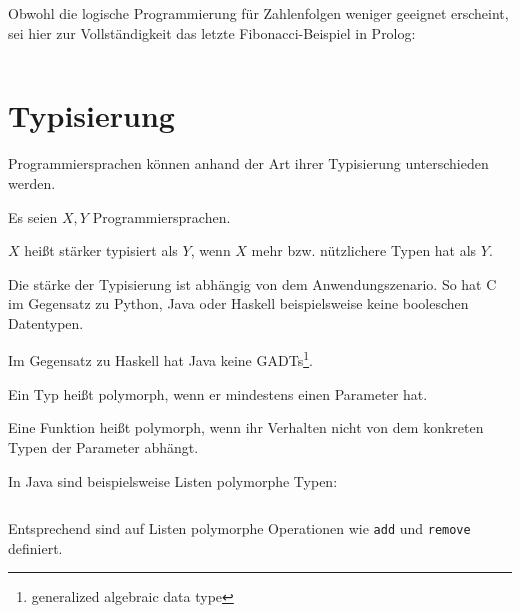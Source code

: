\begin{beispiel}
    Obwohl die logische Programmierung für Zahlenfolgen weniger geeignet erscheint,
    sei hier zur Vollständigkeit das letzte Fibonacci-Beispiel in Prolog:
    \inputminted[numbersep=5pt, tabsize=4]{prolog}{scripts/prolog/fibonacci.pl}
\end{beispiel}

\section{Typisierung}
Programmiersprachen können anhand der Art ihrer Typisierung unterschieden werden.

\begin{definition}[Typisierungsstärke]%
    Es seien $X, Y$ Programmiersprachen.

    $X$ heißt stärker typisiert als $Y$, wenn $X$ mehr bzw. nützlichere Typen hat als $Y$.
\end{definition}

\begin{beispiel}[Typisierungsstärke]
    Die stärke der Typisierung ist abhängig von dem Anwendungszenario. So hat C im
    Gegensatz zu Python, Java oder Haskell beispielsweise keine booleschen Datentypen.

    Im Gegensatz zu Haskell hat Java keine GADTs\footnote{generalized algebraic data type}.
\end{beispiel}

\begin{definition}[Polymorphie]%
    \begin{defenum}
        \item Ein Typ heißt polymorph, wenn er mindestens einen Parameter hat.
        \item Eine Funktion heißt polymorph, wenn ihr Verhalten nicht von dem
              konkreten Typen der Parameter abhängt.
    \end{defenum}
\end{definition}

\begin{beispiel}[Polymorphie]
    In Java sind beispielsweise Listen polymorphe Typen:

    \inputminted[numbersep=5pt, tabsize=4]{java}{scripts/java/list-example.java}

    Entsprechend sind auf Listen polymorphe Operationen wie \texttt{add} und
    \texttt{remove} definiert.
\end{beispiel}

